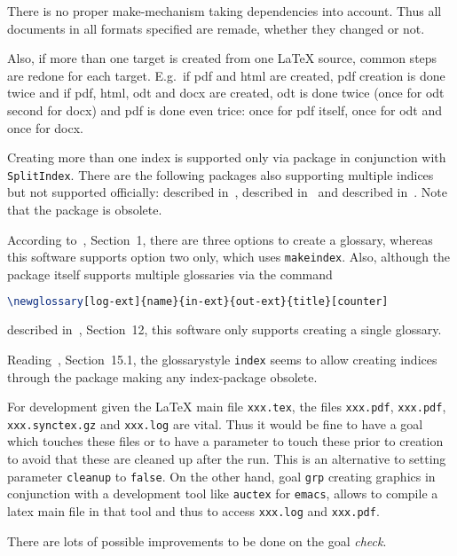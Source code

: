 \documentclass[12pt]{book}
\begin{document}
There is no proper make-mechanism taking dependencies into account. 
Thus all documents in all formats specified are remade, 
whether they changed or not. 

Also, if more than one target is created from one \LaTeX{} source, 
common steps are redone for each target. 
E.g.~if pdf and html are created, 
pdf creation is done twice and if pdf, html, odt and docx are created, 
odt is done twice (once for odt second for docx) 
and pdf is done even trice: 
once for pdf itself, once for odt and once for docx. 

Creating more than one index is supported only 
via package  in conjunction with \texttt{SplitIndex}. 
There are the following packages also supporting multiple indices 
but not supported officially: 
 described in~\cite{IndexP}, 
 described in~\cite{AmsmidxP} and 
 described in~\cite{ImakeidxP}.
Note that the package  is obsolete. 

According to~\cite{GloP}, Section~1, 
there are three options to create a glossary, 
whereas this software supports option two only, 
which uses \texttt{makeindex}. 
Also, although the package  itself 
supports multiple glossaries via the command
%
\begin{lstlisting}[language=TeX, basicstyle=\small]
\newglossary[log-ext]{name}{in-ext}{out-ext}{title}[counter]
\end{lstlisting}
%
described in~\cite{GloP}, Section~12, 
this software only supports creating a single glossary. 

Reading~\cite{GloP}, Section~15.1, the glossarystyle \texttt{index} 
seems to allow creating indices through the  package 
making any index-package obsolete. 

For development given the \LaTeX{} main file \texttt{xxx.tex}, 
the files \texttt{xxx.pdf}, \texttt{xxx.pdf}, \texttt{xxx.synctex.gz} 
and \texttt{xxx.log} are vital. 
Thus it would be fine to have a goal which touches these files 
or to have a parameter to touch these prior to creation 
to avoid that these are cleaned up after the run. 
This is an alternative to setting parameter \texttt{cleanup} to \texttt{false}. 
On the other hand, goal \texttt{grp} creating graphics 
in conjunction with a development tool like \texttt{auctex} for \texttt{emacs}, 
allows to compile a latex main file in that tool 
and thus to access \texttt{xxx.log} and \texttt{xxx.pdf}. 

There are lots of possible improvements to be done on the goal {\em check}. 
\end{document}

